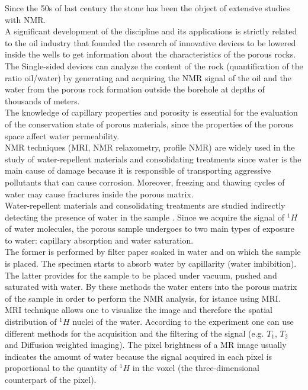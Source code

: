 \documentclass[a4paper,11pt]{report}
\begin{document}
Since the 50s of last century the stone has been the object of extensive studies with NMR.\\
A significant development of the discipline and its applications  is strictly related to the oil industry that founded the research of innovative devices to be lowered inside the wells to get information about the characteristics of the porous rocks. The Single-sided devices can analyze the content of the rock (quantification of the ratio oil/water) by generating and acquiring the NMR signal of the oil and the water from the porous rock formation outside the borehole at depths of thousands of meters\cite{tre}.\\ 
The knowledge of capillary properties and porosity is essential for the evaluation of the conservation state of porous materials, since the properties of the porous space affect water permeability.\\
NMR techniques (MRI, NMR relaxometry, profile NMR) are widely used in the study of water-repellent materials and consolidating treatments since water is the main cause of damage because it is responsible of transporting aggressive pollutants that can cause corrosion. Moreover, freezing and thawing cycles of water may cause fractures inside the porous matrix.\\
Water-repellent materials and consolidating treatments are studied indirectly detecting the presence of water in the sample \cite{settestone}. Since we acquire the signal of $^1H$ of water molecules, the porous sample undergoes to two main types of exposure to water: capillary absorption and water saturation.\\
The former is performed by filter paper soaked in water and on which the sample is placed. The specimen starts to absorb water by capillarity (water imbibition). The latter provides for the sample to be placed under vacuum, pushed and saturated with water.
By these methods the water enters into the porous matrix of the sample in order to perform the NMR analysis, for istance using MRI.\\
MRI technique allows one to visualize the image and therefore the spatial distribution of $^1H$ nuclei of the water. According to the experiment one can use different methods for the acquisition and the filtering of the signal (e.g. $T_1$, $T_2$ and Diffusion weighted imaging). The pixel brightness of a MR image usually indicates the amount of water because the signal acquired in each pixel is proportional to the quantity of $^1H$ in the voxel (the three-dimensional counterpart of the pixel). \\
\end{document}
